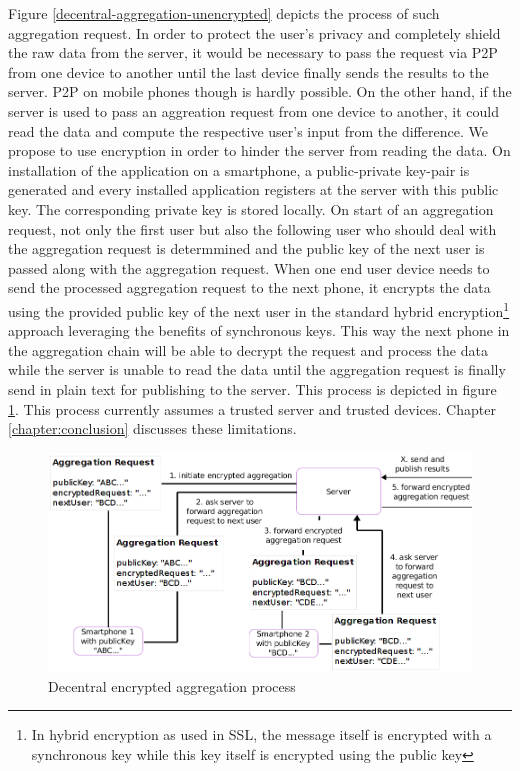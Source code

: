 Figure \ref{decentral-aggregation-unencrypted} depicts the process of such aggregation request.
 In order to protect the user's privacy and completely shield the raw data from the server, it would be necessary to pass the request via P2P from one device to another until the last device finally sends the results to the server. P2P on mobile phones though is hardly possible. On the other hand, if the server is used to pass an aggreation request from one device to another, it could read the data and compute the respective user's input from the difference. We propose to use encryption in order to hinder the server from reading the data. On installation of the application on a smartphone, a public-private key-pair is generated and every installed application registers at the server with this public key. The corresponding private key is stored locally. On start of an aggregation request, not only the first user but also the following user who should deal with the aggregation request is determmined and the public key of the next user is passed along with the aggregation request. When one end user device needs to send the processed aggregation request to the next phone, it encrypts the data using the provided public key of the next user in the standard hybrid encryption\footnote{In hybrid encryption as used in SSL, the message itself is encrypted with a synchronous key while this key itself is encrypted using the public key} approach leveraging the benefits of synchronous keys. This way the next phone in the aggregation chain will be able to decrypt the request and process the data while the server is unable to read the data until the aggregation request is finally send in plain text for publishing to the server. This process is depicted in figure \ref{decentral-aggregation-encrypted}. This process currently assumes a trusted server and trusted devices. Chapter \ref{chapter:conclusion} discusses these limitations.

 \begin{figure}[h!]
	\caption{Decentral encrypted aggregation process}
	\label{decentral-aggregation-encrypted}
	\includegraphics[width=\textwidth]{data/diagrams/decentral-encrypted-aggregation.png}
\end{figure}

